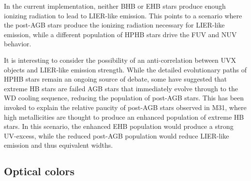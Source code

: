 

In the current implementation, neither BHB or EHB stars produce enough ionizing radiation to lead to LIER-like emission. This points to a scenario where the post-AGB stars produce the ionizing radiation necessary for LIER-like emission, while a different population of HPHB stars drive the FUV and NUV behavior.

It is interesting to consider the possibility of an anti-correlation between UVX objects and LIER-like emission strength. While the detailed evolutionary paths of HPHB stars remain an ongoing source of debate, some have suggested that extreme HB stars are failed AGB stars that immediately evolve through to the WD cooling sequence, reducing the population of post-AGB stars. This has been invoked to explain the relative paucity of post-AGB stars observed in M31, where high metallicities are thought to produce an enhanced population of extreme HB stars. In this scenario, the enhanced EHB population would produce a strong UV-excess, while the reduced post-AGB population would reduce LIER-like emission and thus \ha equivalent widths.










\subsection{Optical colors} \label{sec:stars:continuum:colors}

